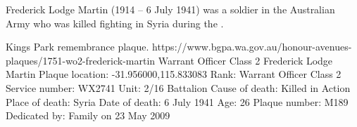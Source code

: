 
Frederick Lodge Martin (1914 -- 6 July 1941) was a soldier in the Australian Army who was killed fighting in Syria during the .

Kings Park remembrance plaque. https://www.bgpa.wa.gov.au/honour-avenues-plaques/1751-wo2-frederick-martin Warrant Officer Class 2 Frederick Lodge Martin Plaque
location: -31.956000,115.833083 Rank: Warrant Officer Class 2 Service number: WX2741 Unit: 2/16 Battalion Cause of death: Killed in Action
Place of death: Syria Date of death: 6 July 1941 Age: 26 Plaque number: M189 Dedicated by: Family on 23 May 2009
